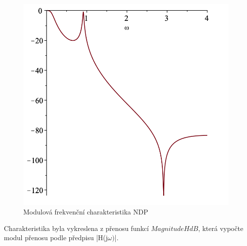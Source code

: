 \documentclass[twoside]{article}
\begin{document}
\begin{figure}[H]
\centering
\includegraphics[scale=0.5]{sch.png}
\caption{Modulová frekvenční charakteristika NDP}
\end{figure}
\noindent Charakteristika byla vykreslena z přenosu funkcí $MagnitudeHdB$, která vypočte modul přenosu podle předpisu |H(j$\omega)$|.
\end{document}
